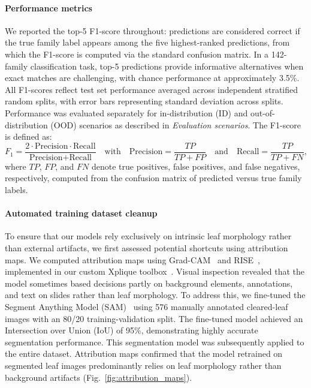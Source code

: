 \documentclass[pdflatex,lineno,sn-nature]{sn-jnl}%
\theoremstyle{plain}%
\theoremstyle{definition}%
\theoremstyle{remark}%
\begin{document}
\paragraph{Performance metrics}
We reported the top-5 F1-score throughout: predictions are considered correct if the true family 
label appears among the five highest-ranked predictions, from which the F1-score is computed 
via the standard confusion matrix. In a 142-family classification 
task, top-5 predictions provide informative alternatives when exact matches are challenging, 
with chance performance at approximately 3.5\%. All F1-scores reflect test set performance averaged across independent stratified random splits, with error bars representing standard deviation across splits. Performance was evaluated separately for in-distribution (ID) and out-of-distribution (OOD) scenarios as described in \textit{Evaluation scenarios}. The F1-score is defined as: 
\[
F_{1} = \frac{2 \cdot \text{Precision} \cdot \text{Recall}}{\text{Precision} + \text{Recall}}
\quad \text{with} \quad
\text{Precision} = \frac{TP}{TP+FP} \quad
\text{and} \quad
\text{Recall} = \frac{TP}{TP+FN},
\]
where $TP$, $FP$, and $FN$ denote true positives, false positives, and false negatives, respectively, computed from the confusion matrix of predicted versus true family labels. 

\paragraph{Automated training dataset cleanup} 
To ensure that our models rely exclusively on intrinsic leaf morphology rather than external artifacts, we first assessed potential shortcuts using attribution maps. We computed attribution maps using Grad-CAM~\citep{Selvaraju_2019} and RISE~\citep{petsiuk2018rise}, implemented in our custom Xplique toolbox~\citep{fel2022xplique}. Visual inspection revealed that the model sometimes based decisions partly on background elements, annotations, and text on slides rather than leaf morphology. To address this, we fine-tuned the Segment Anything Model (SAM)~\citep{kirillov2023segment} using 576 manually annotated cleared-leaf images with an 80/20 training-validation split. The fine-tuned model achieved an Intersection over Union (IoU) of 95\%, demonstrating highly accurate segmentation performance. This segmentation model was subsequently applied to the entire dataset. Attribution maps confirmed that the model retrained on segmented leaf images predominantly relies on leaf morphology rather than background artifacts (Fig.~\ref{fig:attribution_maps}).
\end{document}
